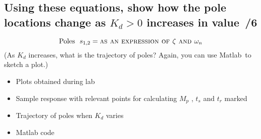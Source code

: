 \documentclass{article}
\newcommand{\score}{\hfill \underline{\hspace{0.65cm}}\,/} %
\newcommand\RR{\textsuperscript{\textregistered}~} %
\begin{document}
\subsection{Using these equations, show how the pole locations change as $K_d >0$ increases in value \score 6}
\[
    \mbox{Poles}~~s_{1,2} = \mbox{\sc as an expression of $\zeta$ and $\omega_n$}
\]
(As $K_d$ increases, what is the trajectory of poles? Again, you can use {\sc Matlab}\RR to sketch a plot.)
\newline \\[3mm]
\begin{itemize}
\item Plots obtained during lab
\item Sample response with relevant points for calculating $M_p$ , $t_s$ and $t_r$ marked
\item Trajectory of poles when $K_d$ varies 
\item {\sc Matlab} code
\end{itemize}
\end{document}
